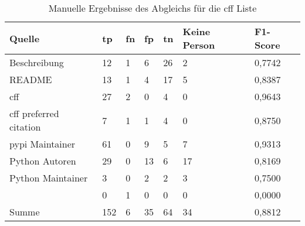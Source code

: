 \begin{table}[H]
    \centering
    \begin{tabularx}{\textwidth}{XR{.7cm}R{.7cm}R{.7cm}R{.7cm}R{2.8cm}R{2cm}}
        \toprule
        \textbf{Quelle} & \textbf{\gls{tp}} & \textbf{\gls{fn}} & \textbf{\gls{fp}} & \textbf{\gls{tn}} & \textbf{Keine Person} & \textbf{F1-Score} \\ \midrule
        Beschreibung                 & 12 & 1  & 6  & 26 & 2  & 0,7742 \\
        README                       & 13 & 1  & 4  & 17 & 5  & 0,8387 \\
        \gls{cff}                    & 27 & 2  & 0  & 4  & 0  & 0,9643\\
        \gls{cff} preferred citation & 7  & 1  & 1  & 4  & 0  & 0,8750 \\
        \gls{pypi} Maintainer        & 61 & 0  & 9  & 5  & 7  & 0,9313 \\
        Python Autoren               & 29 & 0  & 13 & 6  & 17 & 0,8169 \\
        Python Maintainer            & 3  & 0  & 2  & 2  & 3  & 0,7500 \\
                      & 0  & 1  & 0  & 0  & 0  & 0,0000 \\ \midrule
        Summe                        & 152 & 6 & 35 & 64 & 34 & 0,8812 \\
        \bottomrule
    \end{tabularx}
    \caption{Manuelle Ergebnisse des Abgleichs für die \gls{cff} Liste}
    \label{tab:cff_matching_results_manual_anhang}
\end{table}

